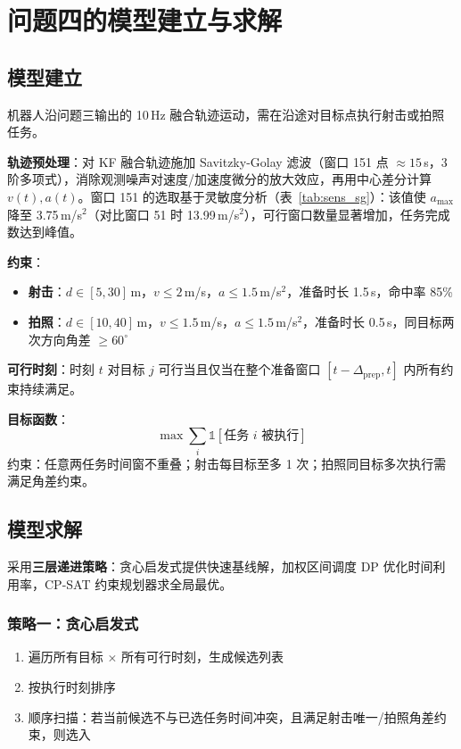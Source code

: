 \section{问题四的模型建立与求解}\label{sec:model4}

\subsection{模型建立}

机器人沿问题三输出的 10\,Hz 融合轨迹运动，需在沿途对目标点执行射击或拍照任务。

\textbf{轨迹预处理}：对 KF 融合轨迹施加 Savitzky-Golay 滤波（窗口 151 点 $\approx 15$\,s，3 阶多项式），消除观测噪声对速度/加速度微分的放大效应，再用中心差分计算 $v(t), a(t)$。窗口 151 的选取基于灵敏度分析（表~\ref{tab:sens_sg}）：该值使 $a_{\max}$ 降至 3.75\,m/s$^2$（对比窗口 51 时 13.99\,m/s$^2$），可行窗口数量显著增加，任务完成数达到峰值。

\textbf{约束}：
\begin{itemize}
    \item \textbf{射击}：$d \in [5, 30]$\,m，$v \le 2$\,m/s，$a \le 1.5$\,m/s$^2$，准备时长 1.5\,s，命中率 85\%
    \item \textbf{拍照}：$d \in [10, 40]$\,m，$v \le 1.5$\,m/s，$a \le 1.5$\,m/s$^2$，准备时长 0.5\,s，同目标两次方向角差 $\ge 60^\circ$
\end{itemize}

\textbf{可行时刻}：时刻 $t$ 对目标 $j$ 可行当且仅当在整个准备窗口 $[t - \Delta_{\text{prep}}, t]$ 内所有约束持续满足。

\textbf{目标函数}：
\begin{equation}
    \max \sum_{i} \mathbb{1}[\text{任务 } i \text{ 被执行}]
\end{equation}
约束：任意两任务时间窗不重叠；射击每目标至多 1 次；拍照同目标多次执行需满足角差约束。

\subsection{模型求解}

采用\textbf{三层递进策略}：贪心启发式提供快速基线解，加权区间调度 DP 优化时间利用率，CP-SAT 约束规划器求全局最优。

\subsubsection{策略一：贪心启发式}

\begin{enumerate}
    \item 遍历所有目标 $\times$ 所有可行时刻，生成候选列表
    \item 按执行时刻排序
    \item 顺序扫描：若当前候选不与已选任务时间冲突，且满足射击唯一/拍照角差约束，则选入
\end{enumerate}

